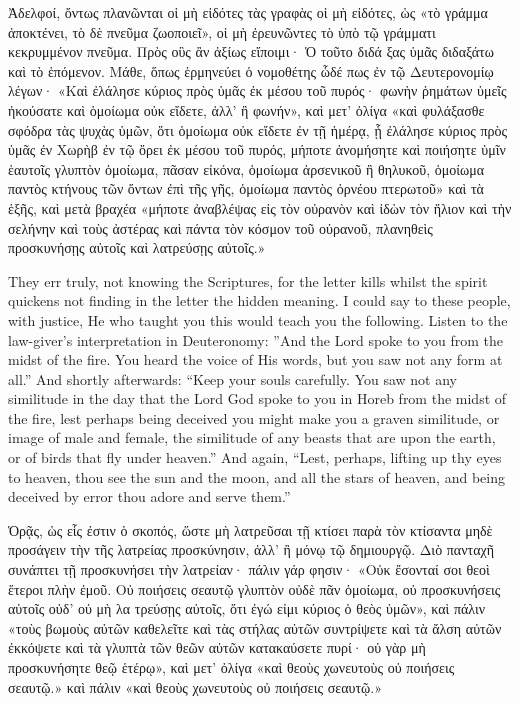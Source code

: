 \documentclass[10pt]{book}
\newcommand{\switchgreek}[1][]{\selectlanguage{polutonikogreek} \switchcolumn*[#1]}
\newcommand{\switchenglish}{\selectlanguage{english} \switchcolumn}
\begin{document}
\begin{paracol}{2}
\switchgreek

Ἀδελφοί, ὄντως πλανῶνται οἱ μὴ εἰδότες τὰς γραφὰς οἱ μὴ εἰδότες, ὡς «τὸ γράμμα ἀποκτένει, τὸ δὲ πνεῦμα ζωοποιεῖ», οἱ μὴ ἐρευνῶντες τὸ ὑπὸ τῷ γράμματι κεκρυμμένον πνεῦμα.
Πρὸς οὓς ἂν ἀξίως εἴποιμι· Ὁ τοῦτο διδά ξας ὑμᾶς διδαξάτω καὶ τὸ ἑπόμενον.
Μάθε, ὅπως ἑρμηνεύει ὁ νομοθέτης ὧδέ πως ἐν τῷ Δευτερονομίῳ λέγων· «Καὶ ἐλάλησε κύριος πρὸς ὑμᾶς ἐκ μέσου τοῦ πυρός· φωνὴν ῥημάτων ὑμεῖς ἠκούσατε καὶ ὁμοίωμα οὐκ εἴδετε, ἀλλ’ ἢ φωνήν», καὶ μετ’ ὀλίγα «καὶ φυλάξασθε σφόδρα τὰς ψυχὰς ὑμῶν, ὅτι ὁμοίωμα οὐκ εἴδετε ἐν τῇ ἡμέρᾳ, ᾗ ἐλάλησε κύριος πρὸς ὑμᾶς ἐν Χωρὴβ ἐν τῷ ὄρει ἐκ μέσου τοῦ πυρός, μήποτε ἀνομήσητε καὶ ποιήσητε ὑμῖν ἑαυτοῖς γλυπτὸν ὁμοίωμα, πᾶσαν εἰκόνα, ὁμοίωμα ἀρσενικοῦ ἢ θηλυκοῦ, ὁμοίωμα παντὸς κτήνους τῶν ὄντων ἐπὶ τῆς γῆς, ὁμοίωμα παντὸς ὀρνέου πτερωτοῦ» καὶ τὰ ἑξῆς, καὶ μετὰ βραχέα «μήποτε ἀναβλέψας εἰς τὸν οὐρανὸν καὶ ἰδὼν τὸν ἥλιον καὶ τὴν σελήνην καὶ τοὺς ἀστέρας καὶ πάντα τὸν κόσμον τοῦ οὐρανοῦ, πλανηθεὶς προσκυνήσῃς αὐτοῖς καὶ λατρεύσῃς αὐτοῖς.»

\switchenglish

They err truly, not knowing the Scriptures, 
for the letter kills whilst the spirit quickens\textemdash
not finding in the letter the hidden meaning. 
I could say to these people, with justice, He 
who taught you this would teach you the 
following. Listen to the law-giver's interpretation in Deuteronomy: ''And the Lord spoke 
to you from the midst of the fire. You heard 
the voice of His words, but you saw not any 
form at all.'' And shortly afterwards: ``Keep 
your souls carefully. You saw not any similitude in the day that the Lord God spoke to 
you in Horeb from the midst of the fire, lest 
perhaps being deceived you might make you a 
graven similitude, or image of male and female, 
the similitude of any beasts that are upon the 
earth, or of birds that fly under heaven.'' And 
again, ``Lest, perhaps, lifting up thy eyes to 
heaven, thou see the sun and the moon, and 
all the stars of heaven, and being deceived by 
error thou adore and serve them.'' 

\switchgreek

Ὁρᾷς, ὡς εἷς ἐστιν ὁ σκοπός, ὥστε μὴ λατρεῦσαι τῇ κτίσει παρὰ τὸν κτίσαντα μηδὲ προσάγειν τὴν τῆς λατρείας προσκύνησιν, ἀλλ’ ἢ μόνῳ τῷ δημιουργῷ.
Διὸ πανταχῆ συνάπτει τῇ προσκυνήσει τὴν λατρείαν· πάλιν γάρ φησιν· «Οὐκ ἔσονταί σοι θεοὶ ἕτεροι πλὴν ἐμοῦ.
Οὐ ποιήσεις σεαυτῷ γλυπτὸν οὐδὲ πᾶν ὁμοίωμα, οὐ προσκυνήσεις αὐτοῖς οὐδ’ οὐ μὴ λα τρεύσῃς αὐτοῖς, ὅτι ἐγώ εἰμι κύριος ὁ θεὸς ὑμῶν», καὶ πάλιν «τοὺς βωμοὺς αὐτῶν καθελεῖτε καὶ τὰς στήλας αὐτῶν συντρίψετε καὶ τὰ ἄλση αὐτῶν ἐκκόψετε καὶ τὰ γλυπτὰ τῶν θεῶν αὐτῶν κατακαύσετε πυρί· οὐ γὰρ μὴ προσκυνήσητε θεῷ ἑτέρῳ», καὶ μετ’ ὀλίγα «καὶ θεοὺς χωνευτοὺς οὐ ποιήσεις σεαυτῷ.»
καὶ πάλιν «καὶ θεοὺς χωνευτοὺς οὐ ποιήσεις σεαυτῷ.»


\end{paracol}
\end{document}
